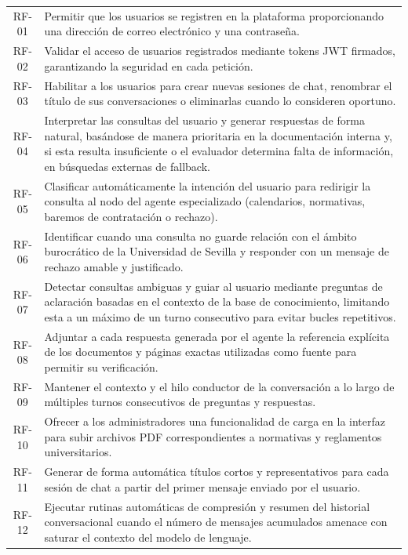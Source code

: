 \documentclass[12pt,a4paper,oneside]{report}
\begin{document}
\begin{longtable}{@{}cp{12cm}@{}}
    RF-01       & Permitir que los usuarios se registren en la plataforma proporcionando una dirección de correo electrónico y una contraseña. \\
    RF-02       & Validar el acceso de usuarios registrados mediante tokens JWT firmados, garantizando la seguridad en cada petición. \\
    RF-03       & Habilitar a los usuarios para crear nuevas sesiones de chat, renombrar el título de sus conversaciones o eliminarlas cuando lo consideren oportuno. \\
    RF-04       & Interpretar las consultas del usuario y generar respuestas de forma natural, basándose de manera prioritaria en la documentación interna y, si esta resulta insuficiente o el evaluador determina falta de información, en búsquedas externas de fallback. \\
    RF-05       & Clasificar automáticamente la intención del usuario para redirigir la consulta al nodo del agente especializado (calendarios, normativas, baremos de contratación o rechazo). \\
    RF-06       & Identificar cuando una consulta no guarde relación con el ámbito burocrático de la Universidad de Sevilla y responder con un mensaje de rechazo amable y justificado. \\
    RF-07       & Detectar consultas ambiguas y guiar al usuario mediante preguntas de aclaración basadas en el contexto de la base de conocimiento, limitando esta a un máximo de un turno consecutivo para evitar bucles repetitivos. \\
    RF-08       & Adjuntar a cada respuesta generada por el agente la referencia explícita de los documentos y páginas exactas utilizadas como fuente para permitir su verificación. \\
    RF-09       & Mantener el contexto y el hilo conductor de la conversación a lo largo de múltiples turnos consecutivos de preguntas y respuestas. \\
    RF-10       & Ofrecer a los administradores una funcionalidad de carga en la interfaz para subir archivos PDF correspondientes a normativas y reglamentos universitarios. \\
    RF-11       & Generar de forma automática títulos cortos y representativos para cada sesión de chat a partir del primer mensaje enviado por el usuario. \\
    RF-12       & Ejecutar rutinas automáticas de compresión y resumen del historial conversacional cuando el número de mensajes acumulados amenace con saturar el contexto del modelo de lenguaje. \\

\end{longtable}
\end{document}
